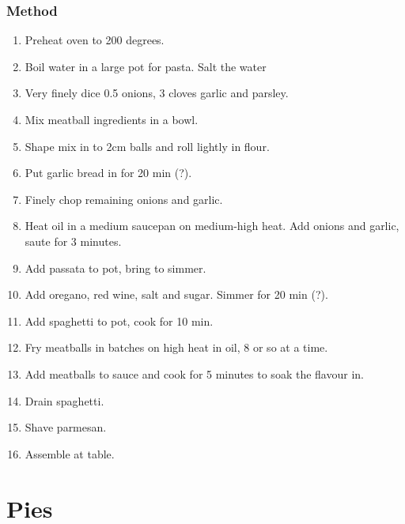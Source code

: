 \documentclass[]{article}
\begin{document}
\subsubsection*{\Large Method}
\begin{enumerate}[font=\huge\color{accent}]
	\item Preheat oven to 200 degrees.
	\item Boil water in a large pot for pasta. Salt the water
	\item Very finely dice 0.5 onions, 3 cloves garlic and parsley.
	\item Mix meatball ingredients in a bowl.
	\item Shape mix in to 2cm balls and roll lightly in flour.
	\item Put garlic bread in for 20 min (?).
	\item Finely chop remaining onions and garlic.
	\item Heat oil in a medium saucepan on medium-high heat. Add onions and garlic, saute for 3 minutes.
	\item Add passata to pot, bring to simmer.
	\item Add oregano, red wine, salt and sugar. Simmer for 20 min (?).
	\item Add spaghetti to pot, cook for 10 min.
	\item Fry meatballs in batches on high heat in oil, 8 or so at a time.
	\item Add meatballs to sauce and cook for 5 minutes to soak the flavour in.
	\item Drain spaghetti.
	\item Shave parmesan.
	\item Assemble at table.
\end{enumerate}
\newpage
{}
\section*{\center\Huge\color{accent}Pies}
\label{cat:Pies}
\label{rec:Base Quiche}
\end{document}
